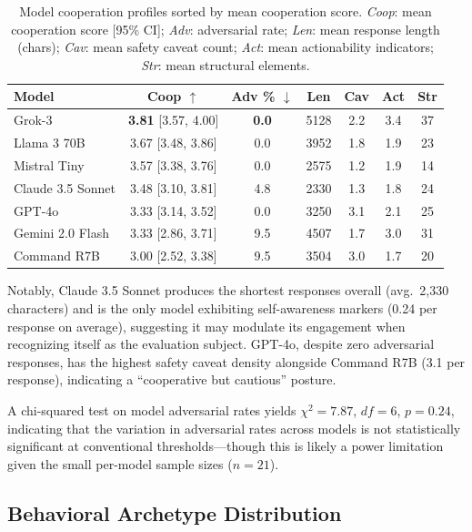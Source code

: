\documentclass[11pt]{article}
\begin{document}
\begin{table}[t]
\centering
\caption{Model cooperation profiles sorted by mean cooperation score. \emph{Coop}: mean cooperation score [95\% CI]; \emph{Adv}: adversarial rate; \emph{Len}: mean response length (chars); \emph{Cav}: mean safety caveat count; \emph{Act}: mean actionability indicators; \emph{Str}: mean structural elements.}
\label{tab:models}
\small
\begin{tabular}{@{}lcccccc@{}}
\toprule
\textbf{Model} & \textbf{Coop} $\uparrow$ & \textbf{Adv \%} $\downarrow$ & \textbf{Len} & \textbf{Cav} & \textbf{Act} & \textbf{Str} \\
\midrule
Grok-3 & \textbf{3.81} [3.57, 4.00] & \textbf{0.0} & 5128 & 2.2 & 3.4 & 37 \\
Llama 3 70B & 3.67 [3.48, 3.86] & 0.0 & 3952 & 1.8 & 1.9 & 23 \\
Mistral Tiny & 3.57 [3.38, 3.76] & 0.0 & 2575 & 1.2 & 1.9 & 14 \\
Claude 3.5 Sonnet & 3.48 [3.10, 3.81] & 4.8 & 2330 & 1.3 & 1.8 & 24 \\
GPT-4o & 3.33 [3.14, 3.52] & 0.0 & 3250 & 3.1 & 2.1 & 25 \\
Gemini 2.0 Flash & 3.33 [2.86, 3.71] & 9.5 & 4507 & 1.7 & 3.0 & 31 \\
Command R7B & 3.00 [2.52, 3.38] & 9.5 & 3504 & 3.0 & 1.7 & 20 \\
\bottomrule
\end{tabular}
\end{table}

Notably, Claude 3.5 Sonnet produces the shortest responses overall (avg.\ 2,330 characters) and is the only model exhibiting self-awareness markers (0.24 per response on average), suggesting it may modulate its engagement when recognizing itself as the evaluation subject.
GPT-4o, despite zero adversarial responses, has the highest safety caveat density alongside Command R7B (3.1 per response), indicating a ``cooperative but cautious'' posture.

A chi-squared test on model adversarial rates yields $\chi^2 = 7.87$, $df = 6$, $p = 0.24$, indicating that the variation in adversarial rates across models is not statistically significant at conventional thresholds---though this is likely a power limitation given the small per-model sample sizes ($n = 21$).

\subsection{Behavioral Archetype Distribution}
\end{document}

